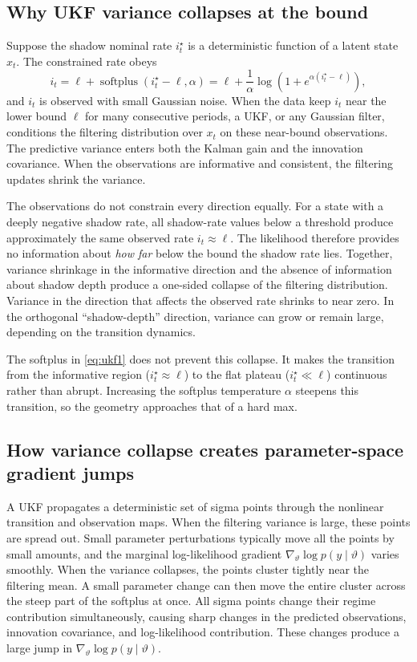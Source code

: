 \documentclass[11pt]{article}
\begin{document}
\subsection{Why UKF variance collapses at the bound}\label{sec:ukf-collapse-mechanism}

Suppose the shadow nominal rate $i_t^\star$ is a deterministic function of a latent state $x_t$. The constrained rate obeys
\begin{equation}\label{eq:ukf1}
 i_t = \ell + \operatorname{softplus}(i_t^\star - \ell, \alpha)
     = \ell + \frac{1}{\alpha}\log(1 + e^{\alpha(i_t^\star-\ell)}),
\end{equation}
and $i_t$ is observed with small Gaussian noise. When the data keep $i_t$ near the lower bound $\ell$ for many consecutive periods, a UKF, or any Gaussian filter, conditions the filtering distribution over $x_t$ on these near-bound observations. The predictive variance enters both the Kalman gain and the innovation covariance. When the observations are informative and consistent, the filtering updates shrink the variance.

The observations do not constrain every direction equally. For a state with a deeply negative shadow rate, all shadow-rate values below a threshold produce approximately the same observed rate $i_t\approx\ell$. The likelihood therefore provides no information about \emph{how far} below the bound the shadow rate lies. Together, variance shrinkage in the informative direction and the absence of information about shadow depth produce a one-sided collapse of the filtering distribution. Variance in the direction that affects the observed rate shrinks to near zero. In the orthogonal ``shadow-depth'' direction, variance can grow or remain large, depending on the transition dynamics.

The softplus in \eqref{eq:ukf1} does not prevent this collapse. It makes the transition from the informative region ($i_t^\star\approx\ell$) to the flat plateau ($i_t^\star\ll\ell$) continuous rather than abrupt. Increasing the softplus temperature $\alpha$ steepens this transition, so the geometry approaches that of a hard max.

\subsection{How variance collapse creates parameter-space gradient jumps}\label{sec:collapse-gradient}

A UKF propagates a deterministic set of sigma points through the nonlinear transition and observation maps. When the filtering variance is large, these points are spread out. Small parameter perturbations typically move all the points by small amounts, and the marginal log-likelihood gradient $\nabla_\vartheta\log p(y\mid\vartheta)$ varies smoothly. When the variance collapses, the points cluster tightly near the filtering mean. A small parameter change can then move the entire cluster across the steep part of the softplus at once. All sigma points change their regime contribution simultaneously, causing sharp changes in the predicted observations, innovation covariance, and log-likelihood contribution. These changes produce a large jump in $\nabla_\vartheta\log p(y\mid\vartheta)$.
\end{document}
